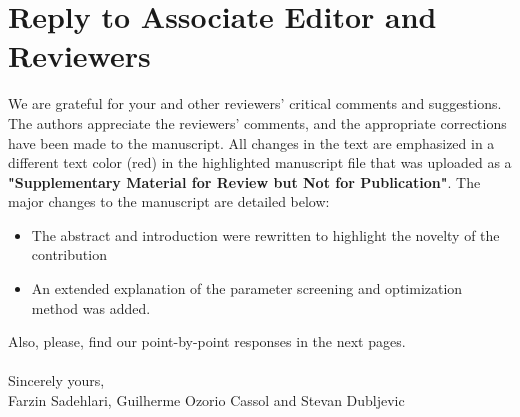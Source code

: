 \documentclass[11pt,answers]{exam}
\begin{document}
\section*{Reply to Associate Editor and Reviewers}
We are grateful for your and other reviewers' critical comments and suggestions. 
\vspace{0.2in}
\\
The authors appreciate the reviewers' comments, and the appropriate corrections have been made to the manuscript. All changes in the text are emphasized in a different text color (red) in the highlighted manuscript file that was uploaded as a {\bf{"Supplementary Material for Review but Not for Publication"}}. The major changes to the manuscript are detailed below:\\
\begin{itemize}
\item{The abstract and introduction were rewritten to highlight the novelty of the contribution}
\item{An extended explanation of the parameter screening and optimization method was added.}
\end{itemize}

Also, please, find our point-by-point responses in the next pages.\\
\\ 
Sincerely yours,\\
Farzin Sadehlari, Guilherme Ozorio Cassol and Stevan Dubljevic
\newpage
\end{document}
